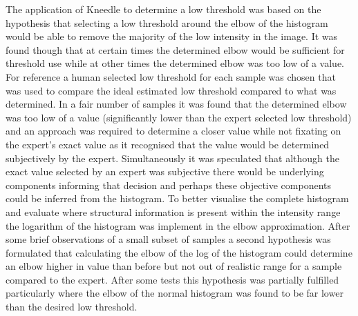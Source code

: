 The application of Kneedle to determine a low threshold was based on the hypothesis that selecting a low threshold around the elbow of the histogram would be able to remove the majority of the low intensity in the image. It was found though that at certain times the determined elbow would be sufficient for threshold use while at other times the determined elbow was too low of a value. For reference a human selected low threshold for each sample was chosen that was used to compare the ideal estimated low threshold compared to what was determined. In a fair number of samples it was found that the determined elbow was too low of a value (significantly lower than the expert selected low threshold) and an approach was required to determine a closer value while not fixating on the expert's exact value as it recognised that the value would be determined subjectively by the expert. Simultaneously it was speculated that although the exact value selected by an expert was subjective there would be underlying components informing that decision and perhaps these objective components could be inferred from the histogram. To better visualise the complete histogram and evaluate where structural information is present within the intensity range the logarithm of the histogram was implement in the elbow approximation. After some brief observations of a small subset of samples a second hypothesis was formulated that calculating the elbow of the log of the histogram could determine an elbow higher in value than before but not out of realistic range for a sample compared to the expert. After some tests this hypothesis was partially fulfilled particularly where the elbow of the normal histogram was found to be far lower than the desired low threshold.%

